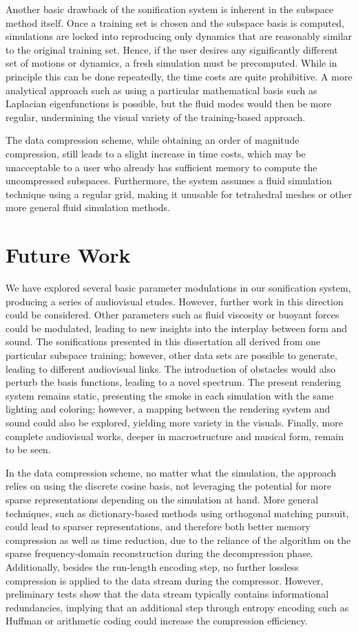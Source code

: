 Another basic drawback of the sonification system is inherent in the subspace method itself. Once a training set is chosen and the subspace basis is computed, simulations are locked into 
reproducing only dynamics that are reasonably similar to the original training set. Hence, if the user desires any significantly different set of motions or dynamics, a fresh simulation must be precomputed.
While in principle this can be done repeatedly, the time costs are quite prohibitive. A more analytical approach such as using a particular mathematical basis such as Laplacian eigenfunctions is possible,
but the fluid modes would then be more regular, undermining the visual variety of the training-based approach.

The data compression scheme, while obtaining an order of magnitude compression, still leads to a slight increase in time costs, which may be unacceptable to a user who already
has sufficient memory to compute the uncompressed subspaces. Furthermore, the system assumes a fluid simulation technique using a regular grid, making it unusable for tetrahedral meshes or other
more general fluid simulation methods.

\section{Future Work}
We have explored several basic parameter modulations in our sonification system, producing a series of audiovisual etudes. However, further work in this direction could be considered. Other
parameters such as fluid viscosity or buoyant forces could be modulated, leading to new insights into the interplay between form and sound. The sonifications presented
in this dissertation all derived from one particular subspace training; however, other data sets are possible to generate, leading to different audiovisual links. The introduction
of obstacles would also perturb the basis functions, leading to a novel spectrum. The present rendering system remains static, presenting the smoke in each simulation
with the same lighting and coloring; however, a mapping between the rendering system and sound could also be explored, yielding more variety in the visuals. Finally, more complete audiovisual works,
deeper in macrostructure and musical form, remain to be seen. 

In the data compression scheme, no matter what the simulation, the approach relies on using the discrete cosine basis, not leveraging the potential for more sparse representations depending
on the simulation at hand. More general techniques, such as dictionary-based methods using orthogonal matching pursuit, could lead to sparser representations, and therefore both better memory compression
as well as time reduction, due to the reliance of the algorithm on the sparse frequency-domain reconstruction during the decompression phase. Additionally, besides the run-length encoding step, no further
lossless compression is applied to the data stream during the compressor. However, preliminary tests show that the data stream typically contains informational redundancies, implying that an additional step through
entropy encoding such as Huffman or arithmetic coding could increase the compression efficiency.